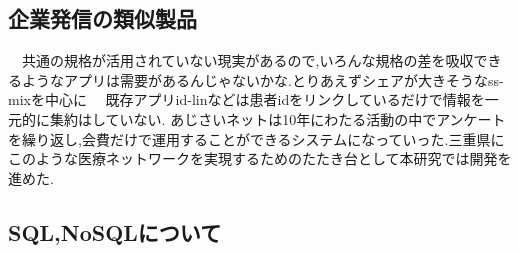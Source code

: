 \subsection{企業発信の類似製品}
　共通の規格が活用されていない現実があるので,いろんな規格の差を吸収できるようなアプリは需要があるんじゃないかな.とりあえずシェアが大きそうなss-mixを中心に
　既存アプリid-linなどは患者idをリンクしているだけで情報を一元的に集約はしていない.
    あじさいネットは10年にわたる活動の中でアンケートを繰り返し,会費だけで運用することができるシステムになっていった.三重県にこのような医療ネットワークを実現するためのたたき台として本研究では開発を進めた.

\subsection{SQL,NoSQLについて}
